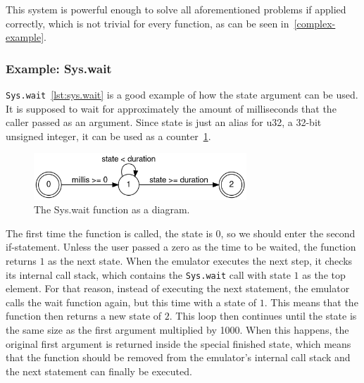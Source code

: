 This system is powerful enough to solve all aforementioned problems if applied correctly, which is not trivial for every function, as can be seen in~\cref{complex-example}.
\subsubsection{Example: Sys.wait} \label{sys.wait-example}
\verb+Sys.wait+~\ref{lst:sys.wait} is a good example of how the state argument can be used.
It is supposed to wait for approximately the amount of milliseconds that the caller passed as an argument.
Since state is just an alias for u32, a 32-bit unsigned integer, it can be used as a counter~\ref{fig:wait-dfa}.
\begin{center}
  \begin{figure}[ht]
    \centering
    \includegraphics[width=8cm]{fig/wait.png}
    \caption{The Sys.wait function as a diagram.}
    \label{fig:wait-dfa}
  \end{figure}
\end{center}
The first time the function is called, the state is \(0\), so we should enter the second if-statement.
Unless the user passed a zero as the time to be waited, the function returns \(1\) as the next state.
When the emulator executes the next step, it checks its internal call stack, which contains the \verb+Sys.wait+ call with state \(1\) as the top element.
For that reason, instead of executing the next statement, the emulator calls the wait function again, but this time with a state of \(1\).
This means that the function then returns a new state of \(2\).
This loop then continues until the state is the same size as the first argument multiplied by 1000.
When this happens, the original first argument is returned inside the special finished state, which means that the function should be removed from the emulator's internal call stack and the next statement can finally be executed.
